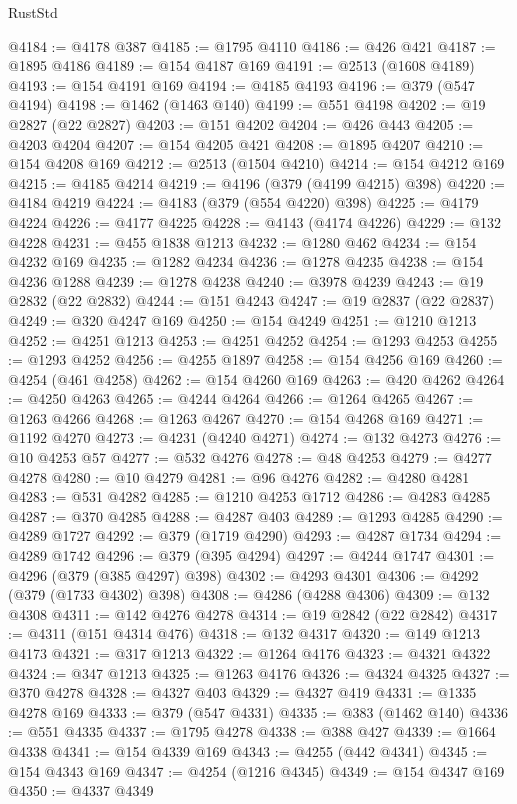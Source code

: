 \begin{lexlean}{RustStd}
\begin{coremodule}
@4184 := @4178 @387
@4185 := @1795 @4110
@4186 := @426 @421
@4187 := @1895 @4186
@4189 := @154 @4187 @169
@4191 := @2513 (@1608 @4189)
@4193 := @154 @4191 @169
@4194 := @4185 @4193
@4196 := @379 (@547 @4194)
@4198 := @1462 (@1463 @140)
@4199 := @551 @4198
@4202 := @19 @2827 (@22 @2827)
@4203 := @151 @4202
@4204 := @426 @443
@4205 := @4203 @4204
@4207 := @154 @4205 @421
@4208 := @1895 @4207
@4210 := @154 @4208 @169
@4212 := @2513 (@1504 @4210)
@4214 := @154 @4212 @169
@4215 := @4185 @4214
@4219 := @4196 (@379 (@4199 @4215) @398)
@4220 := @4184 @4219
@4224 := @4183 (@379 (@554 @4220) @398)
@4225 := @4179 @4224
@4226 := @4177 @4225
@4228 := @4143 (@4174 @4226)
@4229 := @132 @4228
@4231 := @455 @1838 @1213
@4232 := @1280 @462
@4234 := @154 @4232 @169
@4235 := @1282 @4234
@4236 := @1278 @4235
@4238 := @154 @4236 @1288
@4239 := @1278 @4238
@4240 := @3978 @4239
@4243 := @19 @2832 (@22 @2832)
@4244 := @151 @4243
@4247 := @19 @2837 (@22 @2837)
@4249 := @320 @4247 @169
@4250 := @154 @4249
@4251 := @1210 @1213
@4252 := @4251 @1213
@4253 := @4251 @4252
@4254 := @1293 @4253
@4255 := @1293 @4252
@4256 := @4255 @1897
@4258 := @154 @4256 @169
@4260 := @4254 (@461 @4258)
@4262 := @154 @4260 @169
@4263 := @420 @4262
@4264 := @4250 @4263
@4265 := @4244 @4264
@4266 := @1264 @4265
@4267 := @1263 @4266
@4268 := @1263 @4267
@4270 := @154 @4268 @169
@4271 := @1192 @4270
@4273 := @4231 (@4240 @4271)
@4274 := @132 @4273
@4276 := @10 @4253 @57
@4277 := @532 @4276
@4278 := @48 @4253
@4279 := @4277 @4278
@4280 := @10 @4279
@4281 := @96 @4276
@4282 := @4280 @4281
@4283 := @531 @4282
@4285 := @1210 @4253 @1712
@4286 := @4283 @4285
@4287 := @370 @4285
@4288 := @4287 @403
@4289 := @1293 @4285
@4290 := @4289 @1727
@4292 := @379 (@1719 @4290)
@4293 := @4287 @1734
@4294 := @4289 @1742
@4296 := @379 (@395 @4294)
@4297 := @4244 @1747
@4301 := @4296 (@379 (@385 @4297) @398)
@4302 := @4293 @4301
@4306 := @4292 (@379 (@1733 @4302) @398)
@4308 := @4286 (@4288 @4306)
@4309 := @132 @4308
@4311 := @142 @4276 @4278
@4314 := @19 @2842 (@22 @2842)
@4317 := @4311 (@151 @4314 @476)
@4318 := @132 @4317
@4320 := @149 @1213 @4173
@4321 := @317 @1213
@4322 := @1264 @4176
@4323 := @4321 @4322
@4324 := @347 @1213
@4325 := @1263 @4176
@4326 := @4324 @4325
@4327 := @370 @4278
@4328 := @4327 @403
@4329 := @4327 @419
@4331 := @1335 @4278 @169
@4333 := @379 (@547 @4331)
@4335 := @383 (@1462 @140)
@4336 := @551 @4335
@4337 := @1795 @4278
@4338 := @388 @427
@4339 := @1664 @4338
@4341 := @154 @4339 @169
@4343 := @4255 (@442 @4341)
@4345 := @154 @4343 @169
@4347 := @4254 (@1216 @4345)
@4349 := @154 @4347 @169
@4350 := @4337 @4349

\end{coremodule}
\end{lexlean}
